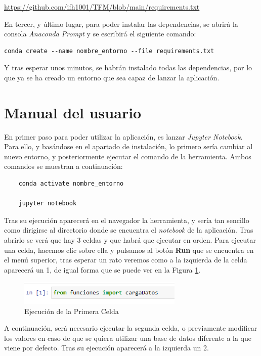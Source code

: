\url{https://github.com/ifh1001/TFM/blob/main/requirements.txt}

En tercer, y último lugar, para poder instalar las dependencias, se abrirá la consola \emph{Anaconda Prompt} y se escribirá el siguiente comando:

\begin{verbatim}
conda create --name nombre_entorno --file requirements.txt
\end{verbatim}

Y tras esperar unos minutos, se habrán instalado todas las dependencias, por lo que ya se ha creado un entorno que sea capaz de lanzar la aplicación.

\section{Manual del usuario}
En primer paso para poder utilizar la aplicación, es lanzar \emph{Jupyter Notebook}. Para ello, y basándose en el apartado de instalación, lo primero sería cambiar al nuevo entorno, y posteriormente ejecutar el comando de la herramienta. Ambos comandos se muestran a continuación:

\begin{verbatim}
    conda activate nombre_entorno
    
    jupyter notebook
\end{verbatim}

Tras su ejecución aparecerá en el navegador la herramienta, y sería tan sencillo como dirigirse al directorio donde se encuentra el \emph{notebook} de la aplicación. Tras abrirlo se verá que hay 3 celdas y que habrá que ejecutar en orden. Para ejecutar una celda, hacemos clic sobre ella y pulsamos al botón \textbf{Run} que se encuentra en el menú superior, tras esperar un rato veremos como a la izquierda de la celda aparecerá un 1, de igual forma que se puede ver en la Figura \ref{f:celda1}.

\begin{figure}[h]
 \centering
  \includegraphics[width=0.7\textwidth]{img/celda1.PNG}
 \caption{Ejecución de la Primera Celda}
 \label{f:celda1}
\end{figure}

A continuación, será necesario ejecutar la segunda celda, o previamente modificar los valores en caso de que se quiera utilizar una base de datos diferente a la que viene por defecto. Tras su ejecución aparecerá a la izquierda un 2.

